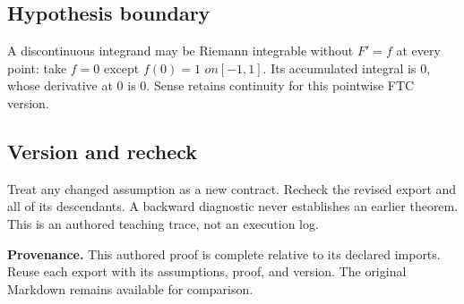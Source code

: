 \documentclass[preprint,12pt,aps,pra,showkeys,amsmath,amssymb,superscriptaddress,floatfix]{revtex4-2}
\theoremstyle{definition}
\theoremstyle{remark}
\begin{document}
\subsection{Hypothesis boundary}
A discontinuous integrand may be Riemann integrable without \(F'=f\) at
every point: take \(f=0\) except \(f(0)=1\) \(on[-1,1]\). Its
accumulated integral is 0, whose derivative at 0 is 0. Sense retains
continuity for this pointwise FTC version.

\subsection{Version and recheck}
Treat any changed assumption as a new contract. Recheck the revised
export and all of its descendants. A backward diagnostic never
establishes an earlier theorem. This is an authored teaching trace, not
an execution log.

\par\medskip\begingroup\small\linespread{1.0}\selectfont\noindent\textbf{Provenance.} This authored proof is complete relative to its declared imports. Reuse
each export with its assumptions, proof, and version. The original
Markdown remains available for comparison.
\par\endgroup
\end{document}
